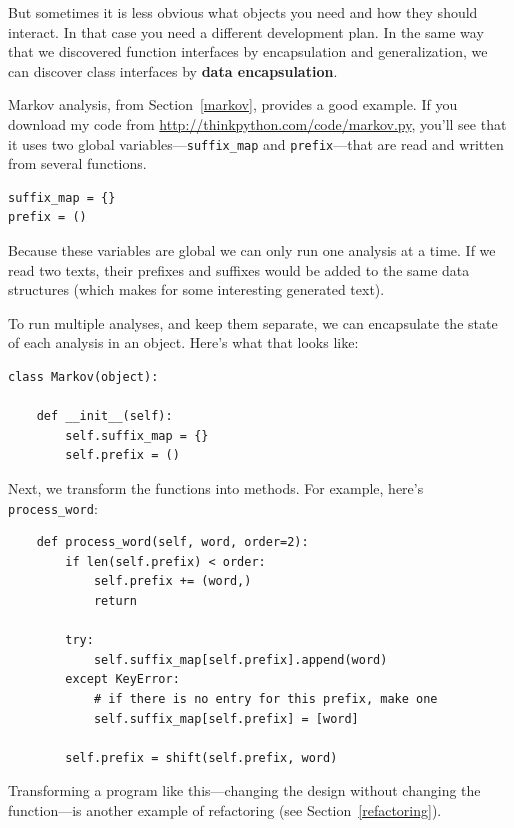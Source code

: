 \documentclass[10pt]{book}
\begin{document}
\begin{CJK}{UTF8}{gbsn}
But sometimes it is less obvious what objects you need
and how they should interact.  In that case you need a different
development plan.  In the same way that we discovered function
interfaces by encapsulation and generalization, we can discover
class interfaces by {\bf data encapsulation}.

Markov analysis, from Section~\ref{markov}, provides a good example.
If you download my code from \url{http://thinkpython.com/code/markov.py},
you'll see that it uses two global variables---\verb"suffix_map" and
\verb"prefix"---that are read and written from several functions.

\begin{verbatim}
suffix_map = {}        
prefix = ()            
\end{verbatim}

Because these variables are global
we can only run one analysis
at a time.  If we read two texts, their prefixes and suffixes would
be added to the same data structures (which makes for some interesting
generated text).

To run multiple analyses, and keep them separate, we can encapsulate
the state of each analysis in an object.
Here's what that looks like:

\begin{verbatim}
class Markov(object):

    def __init__(self):
        self.suffix_map = {}
        self.prefix = ()    
\end{verbatim}

Next, we transform the functions into methods.  For example,
here's \verb"process_word":

\begin{verbatim}
    def process_word(self, word, order=2):
        if len(self.prefix) < order:
            self.prefix += (word,)
            return

        try:
            self.suffix_map[self.prefix].append(word)
        except KeyError:
            # if there is no entry for this prefix, make one
            self.suffix_map[self.prefix] = [word]

        self.prefix = shift(self.prefix, word)        
\end{verbatim}

Transforming a program like this---changing the design without
changing the function---is another example of refactoring
(see Section~\ref{refactoring}).


\end{CJK}
\end{document}

